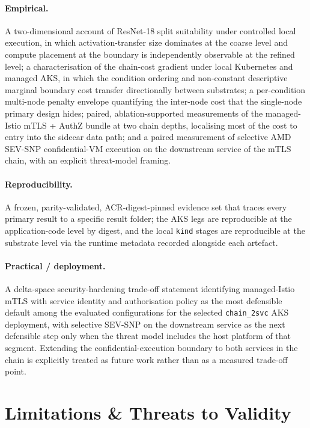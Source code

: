\paragraph{Empirical.} A two-dimensional account of ResNet-18 split
suitability under controlled local execution, in which
activation-transfer size dominates at the coarse level and compute
placement at the boundary is independently observable at the refined
level; a characterisation of the chain-cost gradient under local
Kubernetes and managed AKS, in which the condition ordering and
non-constant descriptive marginal boundary cost transfer directionally between substrates;
a per-condition multi-node penalty envelope quantifying
the inter-node cost that the single-node primary design hides;
paired, ablation-supported measurements of the managed-Istio
mTLS + AuthZ bundle at two chain depths, localising most of the cost
to entry into the sidecar data path; and a paired measurement of
selective AMD SEV-SNP confidential-VM execution on the downstream
service of the mTLS chain, with an explicit threat-model framing.

\paragraph{Reproducibility.} A frozen, parity-validated,
ACR-digest-pinned evidence set that traces every primary result to a
specific result folder; the AKS legs are reproducible at the
application-code level by digest, and the local \texttt{kind} stages
are reproducible at the substrate level via the runtime metadata
recorded alongside each artefact.

\paragraph{Practical / deployment.} A delta-space security-hardening
trade-off statement identifying managed-Istio mTLS with service
identity and authorisation policy as the most defensible default among
the evaluated configurations for
the selected \texttt{chain\_2svc} AKS deployment, with selective
SEV-SNP on the downstream service as the next defensible step only
when the threat model includes the host platform of that segment.
Extending the confidential-execution boundary to both services in
the chain is explicitly treated as future work rather than as a
measured trade-off point.

\section{Limitations \& Threats to Validity}
\label{sec:conclusion-limitations}

